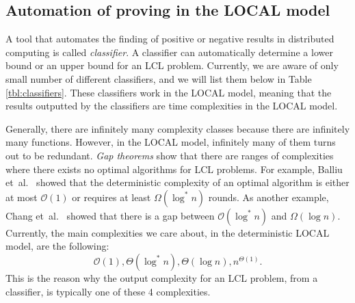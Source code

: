
\subsection{Automation of proving in the LOCAL model} \label{sec:prior_work:automation_of_proving_in_local_model}


A tool that automates the finding of positive or negative results in distributed computing is called \emph{classifier}.
A classifier can automatically determine a lower bound or an upper bound for an LCL problem.
Currently, we are aware of only small number of different classifiers, and we will list them below in Table \ref{tbl:classifiers}.
These classifiers work in the LOCAL model, meaning that the results outputted by the classifiers are time complexities in the LOCAL model.

Generally, there are infinitely many complexity classes because there are infinitely many functions.
However, in the LOCAL model, infinitely many of them turns out to be redundant.
\emph{Gap theorems} show that there are ranges of complexities where there exists no optimal algorithms for LCL problems.
For example, Balliu et~al.~\cite{DBLP:conf/podc/BalliuHOS19} showed that the deterministic complexity of an optimal algorithm is either at most \(\mathcal{O}(1)\) or requires at least \(\Omega(\log^* n)\) rounds.
As another example, Chang et~al.~\cite{DBLP:conf/focs/ChangKP16} showed that there is a gap between \(\mathcal{O}(\log^* n)\) and \(\Omega(\log n)\).
Currently, the main complexities we care about, in the deterministic LOCAL model, are the following:
\[\mathcal{O}(1), \Theta(\log^* n), \Theta(\log n), n^{\Theta(1)}.\]
This is the reason why the output complexity for an LCL problem, from a classifier, is typically one of these 4 complexities.

